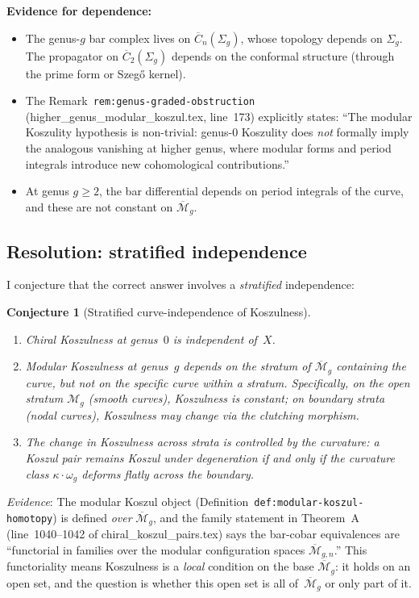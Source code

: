 \documentclass[11pt]{article}
\theoremstyle{plain}
\newtheorem{conjecture}{Conjecture}[section]
\theoremstyle{definition}
\theoremstyle{remark}
\begin{document}
\textbf{Evidence for dependence:}
\begin{itemize}
\item The genus-$g$ bar complex lives on $\overline{C}_n(\Sigma_g)$,
  whose topology depends on $\Sigma_g$.  The propagator on
  $\overline{C}_2(\Sigma_g)$ depends on the conformal structure
  (through the prime form or Szeg\H{o} kernel).
\item The Remark~\texttt{rem:genus-graded-obstruction}
  (higher\_genus\_modular\_koszul.tex, line~173) explicitly
  states: ``The modular Koszulity hypothesis is non-trivial:
  genus-$0$ Koszulity does \emph{not} formally imply the
  analogous vanishing at higher genus, where modular forms and
  period integrals introduce new cohomological contributions.''
\item At genus $g \geq 2$, the bar differential depends on period
  integrals of the curve, and these are not constant on
  $\overline{\mathcal{M}}_g$.
\end{itemize}

\subsection{Resolution: stratified independence}

I conjecture that the correct answer involves a \emph{stratified}
independence:

\begin{conjecture}[Stratified curve-independence of Koszulness]
\label{conj:stratified}
\begin{enumerate}[label=(\roman*)]
\item Chiral Koszulness at genus~$0$ is independent of~$X$.
\item Modular Koszulness at genus~$g$ depends on the
  \emph{stratum} of $\overline{\mathcal{M}}_g$ containing the
  curve, but not on the specific curve within a stratum.
  Specifically, on the open stratum $\mathcal{M}_g$ (smooth
  curves), Koszulness is constant; on boundary strata (nodal
  curves), Koszulness may change via the clutching morphism.
\item The change in Koszulness across strata is controlled by the
  curvature: a Koszul pair remains Koszul under degeneration if
  and only if the curvature class $\kappa \cdot \omega_g$
  deforms flatly across the boundary.
\end{enumerate}
\end{conjecture}

\emph{Evidence}: The modular Koszul object
(Definition~\texttt{def:modular-koszul-homotopy}) is defined
\emph{over} $\overline{\mathcal{M}}_g$, and the family statement
in Theorem~A (line~1040--1042 of chiral\_koszul\_pairs.tex) says
the bar-cobar equivalences are ``functorial in families over the
modular configuration spaces $\overline{\mathcal{M}}_{g,n}$.''
This functoriality means Koszulness is a \emph{local} condition
on the base $\overline{\mathcal{M}}_g$: it holds on an open set,
and the question is whether this open set is all
of~$\overline{\mathcal{M}}_g$ or only part of it.
\end{document}
